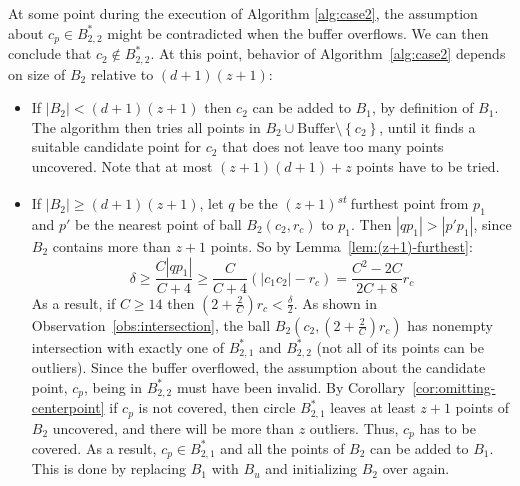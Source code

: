 \documentclass[envcountsame]{cls/cccg15}
\newcommand{\st}{\textsuperscript{\textit{st}} }
\newcommand{\set}[1]{\left\{ #1 \right\}}
\newcommand{\card}[1]{\left|{#1}\right|}
\newcommand{\gee}{\geqslant}
\renewcommand{\geq}{\gee}
\renewcommand{\ge}{\gee}
\begin{document}
At some point during the execution of Algorithm \ref{alg:case2}, the assumption about $c_p \in B_{2,2}^*$ might be contradicted when the buffer overflows. We can then conclude that $c_2 \notin B_{2,2}^*$.
At this point, behavior of Algorithm~\ref{alg:case2} depends on size of $B_2$ relative to $(d+1)(z+1)$:
\begin{itemize}
\item If $\card{B_2} < (d+1)(z+1)$ then $c_2$ can be added to $B_1$, by definition of $B_1$.
The algorithm then tries all points in $B_2 \cup \mbox{Buffer} \setminus \set{c_2}$, until it finds a suitable candidate point for $c_2$ that does not leave too many points uncovered. Note that at most $(z+1)(d+1) + z$ points have to be tried.
\item If $\card{B_2} \ge (d+1)(z+1)$, let $q$ be the $(z+1)$\st furthest point from $p_1$ and $p'$ be the nearest point of ball $B_2(c_2, r_c)$ to $p_1$. Then $\card{qp_1} > \card{p'p_1}$, since $B_2$ contains more than $z+1$ points. So by Lemma~\ref{lem:(z+1)-furthest}:
\[
\delta \ge \frac{C \card{qp_1}}{C+4} \ge \frac{C}{C+4} (\card{c_1c_2} - r_c) = \frac{C^2 - 2C}{2C + 8} r_c
\]
As a result, if $C \geq 14$ then $(2 + \frac{2}{C}) r_c < \frac{\delta}{2}$. As shown in Observation~\ref{obs:intersection}, the ball $B_2(c_2, (2 + \frac{2}{C}) r_c)$ has nonempty intersection with exactly one of $B_{2, 1}^*$ and $B_{2, 2}^*$ (not all of its points can be outliers). Since the buffer overflowed, the assumption about the candidate point, $c_p$, being in $B_{2,2}^*$ must have been invalid. By Corollary~\ref{cor:omitting-centerpoint} if $c_p$ is not covered, then circle $B_{2,1}^*$ leaves at least $z+1$ points of $B_2$ uncovered, and there will be more than $z$ outliers. Thus, $c_p$ has to be covered. As a result, $c_p \in B_{2, 1}^*$ and all the points of $B_2$ can be added to $B_1$. This is done by replacing $B_1$ with $B_u$ and initializing $B_2$ over again.
\end{itemize}
\end{document}
